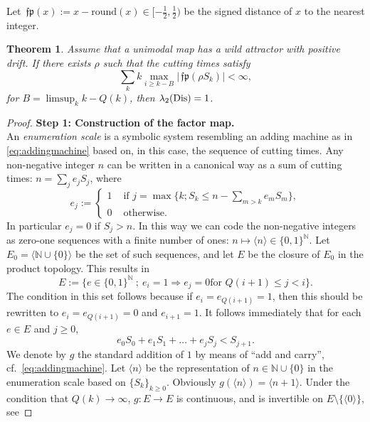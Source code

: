 \documentclass[12pt, psamsfonts, reqno]{amsart}
\newtheorem{theorem}{Theorem}
\begin{document}
Let ${\,\mathfrak{fp}}( x ) := x - \mbox{round}(x) \in [-\frac12,\frac12)$ be
the signed distance of $x$ to the nearest integer.

\begin{theorem}\label{thm:DistalAttractor}
Assume that a unimodal map has a wild attractor with positive
drift. If there exists $\rho$ such that the cutting times satisfy
$$
\sum_k k \max_{i \geq k-B} |{\,\mathfrak{fp}}( \rho S_k )|  < \infty,
$$
for $B = \limsup_k k-Q(k)$, then $\lambda_2({\mathop{\rm Dis}\nolimits}) = 1$.
\end{theorem}

\begin{proof} {\bf Step 1: Construction of the factor map.}\\
An {\em enumeration scale} is a symbolic system resembling an
adding machine as in \eqref{eq:addingmachine} based on, in this
case, the sequence of cutting times. Any non-negative integer $n$
can be written in a canonical way as a sum of cutting times: $n =
\sum_j e_j S_j$, where
\[
e_j := \left\{
\begin{array}{ll}
1 &\text{ if } j = \max\{ k; S_k \leq n- \sum_{m > k} e_m S_m \},\\
0 &\text{ otherwise.}
\end{array} \right.
\]
In particular $e_j = 0$ if $S_j > n$. In this way we can code the
non-negative integers as zero-one sequences with a finite
number of ones: $n \mapsto \langle n \rangle \in \{ 0,1 \}^{{\mathbb N}}$.
Let $E_0 = \langle {{\mathbb N}} \cup \{ 0 \} \rangle$ be the set of such
sequences, and let $E$ be the closure of $E_0$ in the product
topology. This results in
$$
E := \{ e \in \{ 0,1 \}^{{\mathbb N}}\ ;\ e_i = 1 \Rightarrow e_j = 0 \text{
for } Q(i+1) \leq j < i \}.
$$
The condition in this set follows because if $e_i = e_{Q(i+1)} =
1$, then this should be rewritten to $e_i  = e_{Q(i+1)} = 0$ and
$e_{i+1} = 1$. It follows immediately that for each $e \in E$ and
$j \geq 0$,
\begin{equation}\label{rule}
e_0S_0 + e_1 S_1 + \dots + e_j S_j < S_{j+1}.
\end{equation}
We denote by ${g}$ the standard addition of $1$ by means of ``add and carry'',
cf.\ \eqref{eq:addingmachine}.
Let $\langle n \rangle$ be the representation of $n \in {{\mathbb N}}
\cup \{ 0 \}$ in the enumeration scale based on $\{ S_k \}_{k \geq
0}$. Obviously
${g}(\langle n \rangle) = \langle n+1 \rangle$. Under the condition
that $Q(k) \to \infty$, ${g}:E \to E$ is continuous, and is
invertible on $E \setminus \{ \langle 0 \rangle \}$, see

\end{proof}
\end{document}
